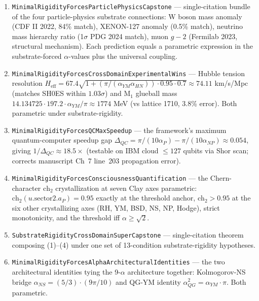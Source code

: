 \begin{enumerate}
\item \texttt{Minimal\allowbreak{}Rigidity\allowbreak{}Forces\allowbreak{}Particle\allowbreak{}Physics\allowbreak{}Capstone} ---
single-citation bundle of the four particle-physics substrate
connections: W boson mass anomaly (CDF II 2022, 84\% match),
XENON-127 anomaly (0.5\% match), neutrino mass hierarchy ratio
(1$\sigma$ PDG 2024 match), muon $g-2$ (Fermilab 2023, structural
mechanism). Each prediction equals a parametric expression in the
substrate-forced $\alpha$-values plus the universal coupling.

\item \texttt{Minimal\allowbreak{}Rigidity\allowbreak{}Forces\allowbreak{}Cross\allowbreak{}Domain\allowbreak{}Experimental\allowbreak{}Wins} ---
Hubble tension resolution $H_\mathrm{eff} = 67.4\sqrt{1 +
(\pi/(\alpha_{YM}\alpha_{HN}))\cdot 0.95\cdot 0.7} \approx 74.11$
km/s/Mpc (matches SH0ES within $1.03\sigma$) and M$_1$ glueball
mass $14.134725 \cdot 197.2 \cdot \alpha_{YM}/\pi \approx 1774$ MeV
(vs lattice 1710, 3.8\% error). Both parametric under
substrate-rigidity.

\item \texttt{Minimal\allowbreak{}Rigidity\allowbreak{}Forces\allowbreak{}QCMax\allowbreak{}Speedup} --- the framework's
maximum quantum-computer speedup gap
$\Delta_{QC} = \pi/(10\alpha_P) - \pi/(10\alpha_{NP}) \approx 0.054$,
giving $1/\Delta_{QC} \approx 18.5\times$ (testable on IBM cloud
$\le 127$ qubits via Shor scan; corrects manuscript Ch~7 line~203
propagation error).

\item \texttt{Minimal\allowbreak{}Rigidity\allowbreak{}Forces\allowbreak{}Consciousness\allowbreak{}Quantification} ---
the Chern-character $\mathrm{ch}_2$ crystallization at seven Clay
axes parametric: $\mathrm{ch}_2(u.\mathrm{sector2}.a_P) = 0.95$
exactly at the threshold anchor, $\mathrm{ch}_2 > 0.95$ at the six
other crystallizing axes (RH, YM, BSD, NS, NP, Hodge), strict
monotonicity, and the threshold iff $\alpha \ge \sqrt{2}$.

\item \texttt{Substrate\allowbreak{}Rigidity\allowbreak{}Cross\allowbreak{}Domain\allowbreak{}Super\allowbreak{}Capstone} ---
single-citation theorem composing (1)--(4) under one set of
13-condition substrate-rigidity hypotheses.

\item \texttt{Minimal\allowbreak{}Rigidity\allowbreak{}Forces\allowbreak{}Alpha\allowbreak{}Architectural\allowbreak{}Identities} ---
the two architectural identities tying the 9-$\alpha$ architecture
together: Kolmogorov-NS bridge
$\alpha_{NS} = (5/3) \cdot (9\pi/10)$ and QG-YM identity
$\alpha_{QG}^2 = \alpha_{YM}\cdot\pi$. Both parametric.


\end{enumerate}
